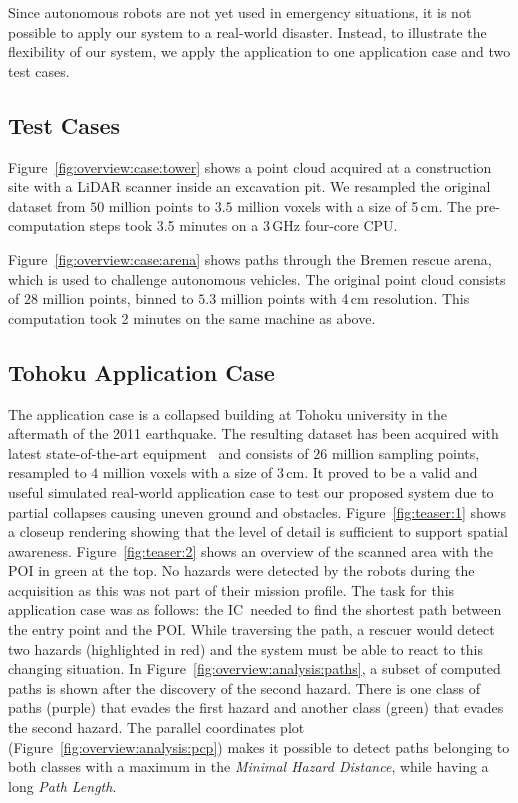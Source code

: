 \documentclass[conference,10pt,letter]{IEEEtran}
\def\IC{IC}
\begin{document}
Since autonomous robots are not yet used in emergency situations, it is not possible to apply our system to a real-world disaster. Instead, to illustrate the flexibility of our system, we apply the application to one application case and two test cases.

\subsection{Test Cases} \label{sec:results:testcases}
 Figure~\ref{fig:overview:case:tower} shows a point cloud acquired at a construction site with a LiDAR scanner inside an excavation pit. We resampled the original dataset from $50$ million points to $3.5$ million voxels with a size of 5\,cm. The pre-computation steps took 3.5 minutes on a 3\,GHz four-core CPU.

 Figure~\ref{fig:overview:case:arena} shows paths through the Bremen rescue arena, which is used to challenge autonomous vehicles. The original point cloud consists of $28$ million points, binned to $5.3$ million points with 4\,cm resolution. This computation took 2 minutes on the same machine as above.

\subsection{Tohoku Application Case} \label{sec:results:applicationcase}
The application case is a collapsed building at Tohoku university in the aftermath of the 2011 earthquake. The resulting dataset has been acquired with latest state-of-the-art equipment~\cite{journals/jfr/NagataniKOOYTNYKFK13} and consists of $26$ million sampling points, resampled to $4$ million voxels with a size of 3\,cm. It proved to be a valid and useful simulated real-world application case to test our proposed system due to partial collapses causing uneven ground and obstacles. Figure~\ref{fig:teaser:1} shows a closeup rendering showing that the level of detail is sufficient to support spatial awareness. Figure~\ref{fig:teaser:2} shows an overview of the scanned area with the POI in green at the top. No hazards were detected by the robots during the acquisition as this was not part of their mission profile. The task for this application case was as follows: the \IC\ needed to find the shortest path between the entry point and the POI. While traversing the path, a rescuer would detect two hazards (highlighted in red) and the system must be able to react to this changing situation. In Figure~\ref{fig:overview:analysis:paths}, a subset of computed paths is shown after the discovery of the second hazard. There is one class of paths (purple) that evades the first hazard and another class (green) that evades the second hazard. The parallel coordinates plot (Figure~\ref{fig:overview:analysis:pcp}) makes it possible to detect paths belonging to both classes with a maximum in the \emph{Minimal Hazard Distance}, while having a long \emph{Path Length}.
\end{document}
